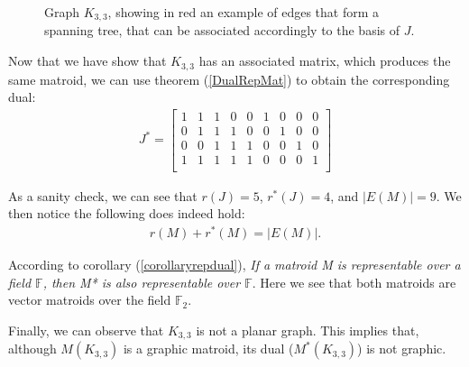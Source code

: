 \begin{exmp}
\begin{figure}[H]
    \centering
    \caption{Graph $K_{3,3}$, showing in red an example of edges that form a spanning tree, that can be associated accordingly to the basis of $J$.}
    \label{K33STE}
\end{figure}

Now that we have show that $K_{3,3}$ has an associated matrix, which produces the same matroid, we can use theorem (\ref{DualRepMat}) to obtain the corresponding dual:
\begin{align*}
  J^*=\begin{bmatrix} 
1 & 1 & 1 & 0 & 0 & 1 & 0 & 0 & 0\\
0 & 1 & 1 & 1 & 0 & 0 & 1 & 0 & 0\\
0 & 0 & 1 & 1 & 1 & 0 & 0 & 1 & 0\\
1 & 1 & 1 & 1 & 1 & 0 & 0 & 0 & 1\\
\end{bmatrix}
\end{align*}

As a sanity check, we can see that $r(J) = 5$,  $r^*(J)=4$, and $|E(M)|=9$. We then notice the following does indeed hold:
\begin{align*}
r(M) + r^*(M) = |E(M)|.
\end{align*}

According to corollary (\ref{corollaryrepdual}), \textit{If a matroid \textit{M} is \textit{representable} over a field $\mathbb{F}$, then \textit{M*} is also representable over $\mathbb{F}$}. Here we see that both matroids are vector matroids over the field $\mathbb{F}_2$. 

Finally, we can observe that $K_{3,3}$ is not a planar graph. This implies that, although $M(K_{3,3})$ is a graphic matroid, its dual ($M^*(K_{3,3})$) is not graphic.
\end{exmp}
